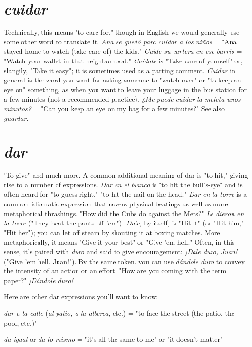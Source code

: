 \section{\emph{cuidar}}

Technically, this means "to care for," though in English we
would generally use some other word to translate it. \emph{Ana se quedó
para cuidar a los niños} = "Ana stayed home to watch (take care of)
the kids." \emph{Cuide su cartera en ese barrio} = "Watch your wallet in that
neighborhood." \emph{Cuídate} is "Take care of yourself" or, slangily, "Take it
easy"; it is sometimes used as a parting comment. \emph{Cuidar} in general is
the word you want for asking someone to "watch over" or "to keep an
eye on" something, as when you want to leave your luggage in the bus
station for a few minutes (not a recommended practice). \emph{¿Me puede
cuidar la maleta unos minutos?} = "Can you keep an eye on my bag
for a few minutes?" See also \emph{guardar}.

\section{\emph{dar}}

'To give" and much more. A common additional meaning of
dar is "to hit," giving rise to a number of expressions. \emph{Dar en el blanco}
is "to hit the bull's-eye" and is often heard for "to guess right," "to hit
the nail on the head." \emph{Dar en la torre} is a common idiomatic expression that covers physical beatings as well as more metaphorical thrashings. "How did the Cubs do against the Mets?" \emph{Le dieron en la torre}
("They beat the pants off 'em"). \emph{Dale}, by itself, is "Hit it" (or "Hit
him," "Hit her"); you can let off steam by shouting it at boxing matches.
More metaphorically, it means "Give it your best" or "Give 'em hell."
Often, in this sense, it's paired with \emph{duro} and said to give encouragement: \emph{¡Dale duro, Juan!} ("Give 'em hell, Juan!"). By the same token,
you can use \emph{dándole duro} to convey the intensity of an action or an
effort. "How are you coming with the term paper?" \emph{¡Dándole duro!}

Here are other dar expressions you'll want to know:

\bsk

\indu \emph{dar a la calle} (\emph{al patio, a la alberca}, etc.) = "to face the street
(the patio, the pool, etc.)"

\indu \emph{da igual} or \emph{da lo mismo} = "it's all the same to me" or "it
doesn't matter"

